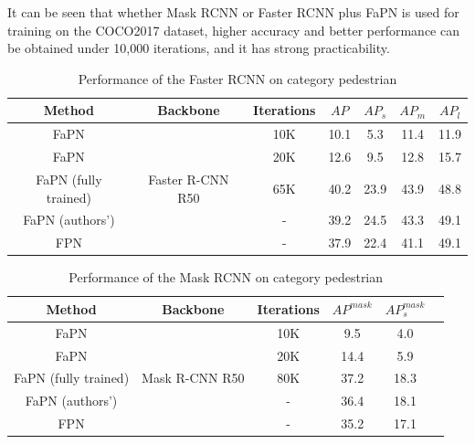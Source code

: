 It can be seen that whether Mask RCNN \cite{he2017mask} or Faster RCNN plus FaPN is used for training on the COCO2017 dataset, higher accuracy and better performance can be obtained under 10,000 iterations, and it has strong practicability.


\begin{table}[htb]
    \begin{center}
        \caption{Performance of the Faster RCNN on category pedestrian}\label{table1}
        \begin{tabular}{|c|c|c|c|c|c|c|} %
            \toprule
            \textbf{Method} & \textbf{Backbone}&\textbf{Iterations} & $AP$ & $AP_s$ & $AP_m$ & $AP_l$ \\
            \hline
            FaPN          & \multirow{5}{*}{Faster R-CNN R50}&10K &10.1&5.3&11.4&11.9 \\
            FaPN          &  &20K&12.6&9.5&12.8&15.7 \\
			FaPN (fully trained)         & &65K &40.2&23.9&43.9&48.8 \\
			FaPN (authors')         &  &-&39.2&24.5&43.3&49.1 \\
			FPN  & &- &37.9&22.4&41.1&49.1 \\
            \bottomrule
        \end{tabular}
    \end{center}
\end{table}

\begin{table}[htb]
		\begin{center}
			\caption{Performance of the Mask RCNN on category pedestrian}\label{table2}
			\begin{tabular}{|c|c|c|c|c|c} %
				\toprule
				\textbf{Method} & \textbf{Backbone}&\textbf{Iterations} & $AP^{mask}$ & $AP^{mask}_s$ \\
				\hline
				FaPN & \multirow{5}{*}{Mask R-CNN R50}&10K&9.5&4.0 \\
				FaPN & &20K&14.4&5.9 \\
				FaPN (fully trained) & &80K &37.2&18.3 \\
				FaPN (authors') & &- &36.4&18.1 \\
				FPN & &- &35.2&17.1 \\
				\bottomrule
			\end{tabular}
		\end{center}
	\end{table}


